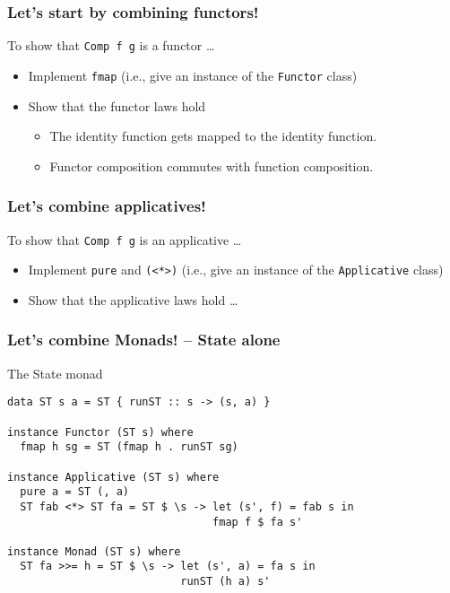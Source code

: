 \documentclass[pdftex,aspectratio=169]{beamer}
\begin{document}
\begin{frame}
  \frametitle{Let's start by combining functors!}
  \begin{block}{To show that \lstinline{Comp f g} is a functor \dots}
    \begin{itemize}
    \item Implement \lstinline{fmap} (i.e., give an instance of the
      \lstinline{Functor} class)
    \item Show that the functor laws hold
      \begin{itemize}
      \item The identity function gets mapped to the identity
        function.
      \item Functor composition commutes with function composition.
      \end{itemize}
    \end{itemize}
  \end{block}
\end{frame}

\begin{frame}
  \frametitle{Let's combine applicatives!}
  \begin{block}{To show that \lstinline{Comp f g} is an applicative \dots}
    \begin{itemize}
    \item Implement \lstinline{pure} and \lstinline{(<*>)} (i.e., give an instance of the
      \lstinline{Applicative} class)
    \item Show that the applicative laws hold \dots
    \end{itemize}
  \end{block}

\end{frame}

\begin{frame}[fragile]
  \frametitle{Let's combine Monads! -- State alone}

  \begin{block}{The State monad}
\begin{lstlisting}
data ST s a = ST { runST :: s -> (s, a) }

instance Functor (ST s) where
  fmap h sg = ST (fmap h . runST sg)

instance Applicative (ST s) where
  pure a = ST (, a)
  ST fab <*> ST fa = ST $ \s -> let (s', f) = fab s in
                                fmap f $ fa s'

instance Monad (ST s) where
  ST fa >>= h = ST $ \s -> let (s', a) = fa s in
                           runST (h a) s'
\end{lstlisting}
  \end{block}
\end{frame}
\end{document}
